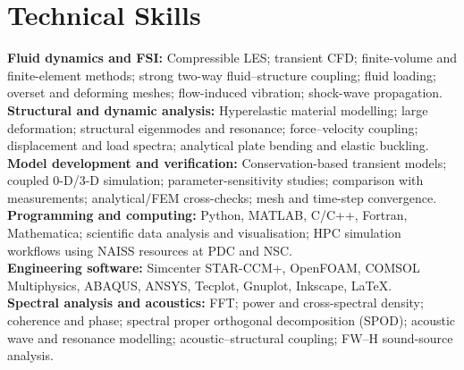 \documentclass[a4paper,10pt]{article}
\begin{document}
\section{Technical Skills}
\textbf{Fluid dynamics and FSI:} Compressible LES; transient CFD; finite-volume and finite-element
methods; strong two-way fluid--structure coupling; fluid loading; overset and deforming meshes;
flow-induced vibration; shock-wave propagation.\\[3pt]
\textbf{Structural and dynamic analysis:} Hyperelastic material modelling; large deformation;
structural eigenmodes and resonance; force--velocity coupling; displacement and load spectra;
analytical plate bending and elastic buckling.\\[3pt]
\textbf{Model development and verification:} Conservation-based transient models; coupled 0-D/3-D
simulation; parameter-sensitivity studies; comparison with measurements; analytical/FEM
cross-checks; mesh and time-step convergence.\\[3pt]
\textbf{Programming and computing:} Python, MATLAB, C/C++, Fortran, Mathematica;
scientific data analysis and visualisation; HPC simulation workflows using NAISS resources
at PDC and NSC.\\[3pt]
\textbf{Engineering software:} Simcenter STAR-CCM+, OpenFOAM, COMSOL Multiphysics,
ABAQUS, ANSYS, Tecplot, Gnuplot, Inkscape, LaTeX.\\[3pt]
\textbf{Spectral analysis and acoustics:} FFT; power and cross-spectral density; coherence and phase;
spectral proper orthogonal decomposition (SPOD); acoustic wave and resonance modelling;
acoustic--structural coupling; FW--H sound-source analysis.
\end{document}
